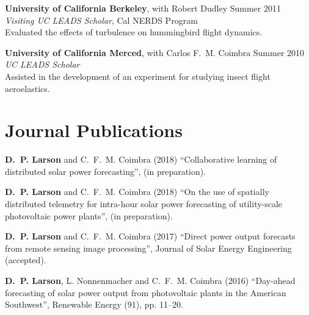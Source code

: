 \documentclass[]{res}
\begin{document}
\begin{resume}
\textbf{University of California Berkeley}, with Robert Dudley \hfill Summer 2011 \\
\textit{Visiting UC LEADS Scholar}, Cal NERDS Program \\
Evaluated the effects of turbulence on hummingbird flight dynamics.

\textbf{University of California Merced}, with Carlos F.~M. Coimbra \hfill Summer 2010 \\
\textit{UC LEADS Scholar} \\
Assisted in the development of an experiment for studying insect flight aeroelastics.


%
%

%


\section{Journal Publications}
\vspace{0.1in}

\textbf{D.~P. Larson} and C.~F.~M. Coimbra (2018) ``Collaborative learning of distributed solar power forecasting'', (in preparation).

\textbf{D.~P. Larson} and C.~F.~M. Coimbra (2018) ``On the use of spatially distributed telemetry for intra-hour solar power forecasting of utility-scale photovoltaic power plants'', (in preparation).

\textbf{D.~P. Larson} and C.~F.~M. Coimbra (2017) ``Direct power output forecasts from remote sensing image processing'', Journal of Solar Energy Engineering (accepted).

\textbf{D.~P. Larson}, L. Nonnenmacher and C.~F.~M. Coimbra (2016) ``Day-ahead forecasting of solar power output from photovoltaic plants in the American Southwest'', Renewable Energy (91), pp. 11--20.



\end{resume}
\end{document}

